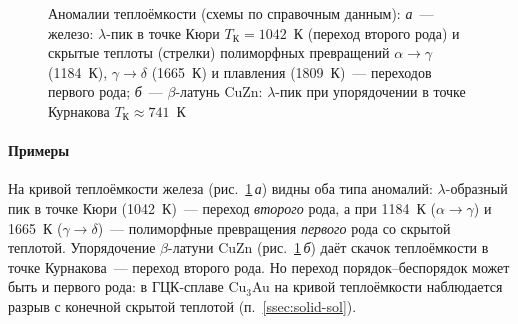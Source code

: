 \begin{figure}[ht]
\begin{subfigure}[b]{0.4\textwidth}
\caption{}
\end{subfigure}
\caption{Аномалии теплоёмкости (схемы по справочным данным): \textit{а}~—
железо: $\lambda$-пик в точке Кюри $T_\text{К}=1042$~К (переход второго
рода) и скрытые теплоты (стрелки) полиморфных превращений
$\alpha\to\gamma$ (1184~К), $\gamma\to\delta$ (1665~К) и плавления
(1809~К)~— переходов первого рода; \textit{б}~— $\beta$-латунь CuZn:
$\lambda$-пик при упорядочении в точке Курнакова $T_\text{К}\approx741$~К}
\label{fig:fe-cp}
\end{figure}

\paragraph{Примеры}
На кривой теплоёмкости железа (рис.~\ref{fig:fe-cp}\,\textit{а}) видны
оба типа аномалий: $\lambda$-образный пик в точке Кюри (1042~К)~—
переход \emph{второго} рода, а при 1184~К ($\alpha\to\gamma$) и 1665~К
($\gamma\to\delta$)~— полиморфные превращения \emph{первого} рода со
скрытой теплотой. Упорядочение $\beta$-латуни CuZn
(рис.~\ref{fig:fe-cp}\,\textit{б}) даёт скачок теплоёмкости в точке
Курнакова~— переход второго рода. Но переход порядок--беспорядок может
быть и первого рода: в ГЦК-сплаве Cu$_3$Au на кривой теплоёмкости
наблюдается разрыв с конечной скрытой теплотой (п.~\ref{ssec:solid-sol}).
